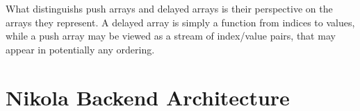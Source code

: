 What distinguishs push arrays and delayed arrays is their perspective on the
arrays they represent. A delayed array is simply a function from indices to
values, while a push array may be viewed as a stream of index/value pairs, that
may appear in potentially any ordering.


\section{Nikola Backend Architecture}


